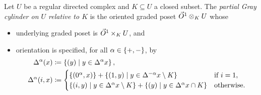\begin{dfn}
	Let \( U \) be a regular directed complex and \( K \subseteq U \) a closed subset.
	The \emph{partial Gray cylinder on \( U \) relative to \( K \)} is the oriented graded poset \( \vec{O}^{1} \otimes_K U \) whose
    \begin{itemize}
        \item underlying graded poset is \( \vec{O}^{1} \times_K U \), and
        \item orientation is specified, for all \( \alpha \in \left\{ {+, -} \right\} \), by
        \begin{align*}
            \Delta_{}^{\alpha}(x) & \coloneqq \left\{ {(y) \mid y \in \Delta_{}^{\alpha}x} \right\}, \\
            \Delta_{}^{\alpha}(i, x) & \coloneqq \begin{cases}
                \left\{ {(0^\alpha, x)} \right\} + \left\{ {(1, y) \mid y \in \Delta_{}^{-\alpha}x \setminus K} \right\} &
                \text{if \( i = 1 \),} \\
                \left\{ {(i, y) \mid y \in \Delta_{}^{\alpha}x \setminus K} \right\} + 
                \left\{ {(y) \mid y \in \Delta_{}^{\alpha}x \cap K} \right\} &
                \text{otherwise}.
            \end{cases}
        \end{align*}
    \end{itemize}
\end{dfn}

